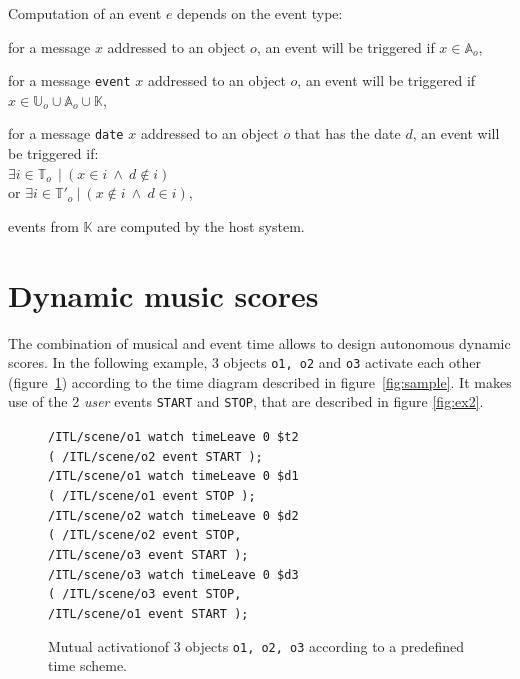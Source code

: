 \documentclass{article}
\newcommand{\OSC}[1]	{{\fontsize{8.5pt}{8pt} \selectfont\texttt{#1}}}
\newcommand{\tab}{\hspace*{4mm}}
\let\olditemize\itemize
\let\oldenditemize\enditemize
\renewenvironment{itemize} 	{\olditemize \renewcommand{\labelitemi}{$\bullet$} \setlength{\itemsep}{0mm}}{\oldenditemize}
\newcommand{\sample}[1]		{\vspace{-0.2em}\begin{center}\colorbox{mygrey}{\begin{minipage}[t]{0.98\columnwidth} {\small \texttt{#1}}\end{minipage}}\end{center}}
\begin{document}
Computation of an event $e$ depends on the event type:
\begin{itemize}
\item[-] for a message $x$ addressed to an object $o$, an event will be triggered if $x \in \mathbb{A}_o$, 
\item[-] for a message \OSC{event} $x$ addressed to an object $o$, an event will be triggered if $x \in \mathbb{U}_o \cup \mathbb{A}_o \cup  \mathbb{K}$,
\item[-] for a message \OSC{date} $x$ addressed to an object $o$ that has the date $d$, an event will be triggered if:\\ 
\hspace*{3.5mm} $\exists i \in \mathbb{T}_o\ \ |\ (x \in i\ \land\ d \not\in i)$ \\
or $\exists i \in \mathbb{T'}_o\ |\ (x \not \in i\ \land\ d \in i)$,
\item[-] events from $\mathbb{K}$ are computed by the host system.
\end{itemize}

\section{Dynamic music scores}

The combination of musical and event time allows to design autonomous dynamic scores. In the following example, 3 objects \OSC{o1, o2} and \OSC{o3} activate each other (figure~\ref{fig:ex1}) according to the time diagram described in figure~\ref{fig:sample}. It makes use of the 2 \emph{user} events \OSC{START} and \OSC{STOP}, that are described in figure \ref{fig:ex2}.

\begin{figure}[h]
   \centering
\sample{/ITL/scene/o1 watch timeLeave 0 \$t2 \\
   \tab( /ITL/scene/o2 event START );\\
	/ITL/scene/o1 watch timeLeave 0 \$d1 \\
	\tab( /ITL/scene/o1 event STOP );\\
	/ITL/scene/o2 watch timeLeave 0 \$d2 \\
	\tab( /ITL/scene/o2 event STOP, \\
	\tab \tab/ITL/scene/o3 event START );\\
	/ITL/scene/o3 watch timeLeave 0 \$d3 \\
	\tab( /ITL/scene/o3 event STOP, \\
	\tab \tab/ITL/scene/o1 event START );
}
   \caption{Mutual activationof 3 objects \OSC{o1, o2, o3} according to a predefined time scheme.}
   \label{fig:ex1}
\end{figure}
\end{document}
